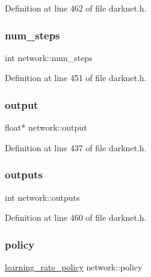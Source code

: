 Definition at line 462 of file darknet.\+h.

\mbox{\label{structnetwork_a6e656092c18afdc2bcb72f87d0ed2547}} 
\subsubsection{\texorpdfstring{num\_steps}{num\_steps}}
{\footnotesize\ttfamily int network\+::num\+\_\+steps}



Definition at line 451 of file darknet.\+h.

\mbox{\label{structnetwork_a274dce0db2d5175992eb3b273ab09df7}} 
\subsubsection{\texorpdfstring{output}{output}}
{\footnotesize\ttfamily float$\ast$ network\+::output}



Definition at line 437 of file darknet.\+h.

\mbox{\label{structnetwork_a5268de11127a02d86e6f517cf3b3acc9}} 
\subsubsection{\texorpdfstring{outputs}{outputs}}
{\footnotesize\ttfamily int network\+::outputs}



Definition at line 460 of file darknet.\+h.

\mbox{\label{structnetwork_a78121635a0f0c3a1d9991390b4325dc3}} 
\subsubsection{\texorpdfstring{policy}{policy}}
{\footnotesize\ttfamily \mbox{\hyperlink{darknet_8h_a9c2ce38711c59085616b738d2aa21184}{learning\+\_\+rate\+\_\+policy}} network\+::policy}



